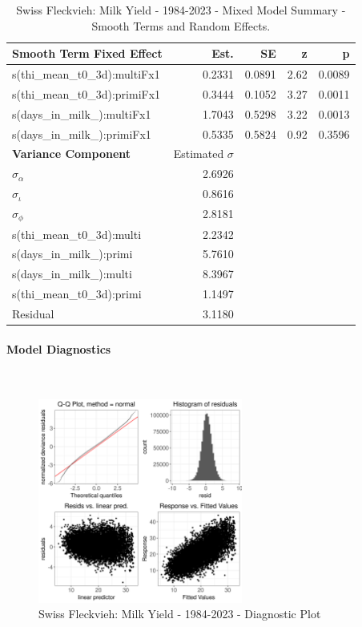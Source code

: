 \newpage
\begin{table}[H]
\centering
\begin{tabular}
{l | r | r | r | r}
\textbf{Smooth Term Fixed Effect} & Est. & SE & z & p\\
\hline
\hline
s(thi\_mean\_t0\_3d):multiFx1 & 0.2331 & 0.0891 & 2.62 & 0.0089\\
s(thi\_mean\_t0\_3d):primiFx1 & 0.3444 & 0.1052 & 3.27 & 0.0011\\
s(days\_in\_milk\_):multiFx1 & 1.7043 & 0.5298 & 3.22 & 0.0013\\
s(days\_in\_milk\_):primiFx1 & 0.5335 & 0.5824 & 0.92 & 0.3596\\
\hline
\textbf{Variance Component} & Estimated $\sigma$ & & & \\
\hline
\hline
$\sigma_\alpha$ & 2.6926 & & & \\
$\sigma_\iota$ & 0.8616 & & & \\
$\sigma_\phi$ & 2.8181 & & & \\
s(thi\_mean\_t0\_3d):multi &  2.2342 & & & \\
s(days\_in\_milk\_):primi & 5.7610 & & & \\
s(days\_in\_milk\_):multi & 8.3967 & & & \\
s(thi\_mean\_t0\_3d):primi & 1.1497 & & & \\
Residual & 3.1180 & & & \\
\end{tabular}
\caption[]{Swiss Fleckvieh: Milk Yield - 1984-2023 - Mixed Model Summary - Smooth Terms and Random Effects.}
\end{table}

\paragraph{Model Diagnostics} \quad \\
\begin{figure}[H]
    \centering
    \includegraphics[width=0.6\textwidth]{thesis/figures/models/milk/full/sf_milk_full/sf_milk_full_diagnostics.png}
    \caption[]{Swiss Fleckvieh: Milk Yield - 1984-2023 - Diagnostic Plot}
\end{figure}

